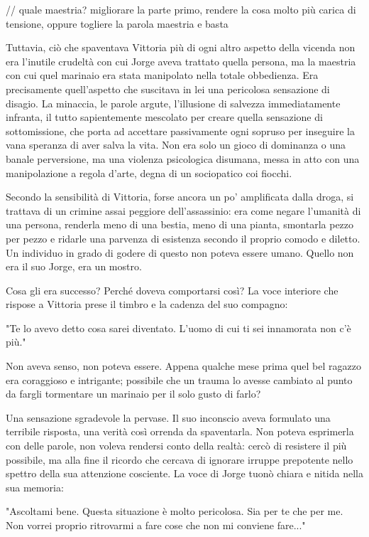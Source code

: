 // quale maestria? migliorare la parte primo, rendere la cosa molto più carica di tensione, oppure togliere la parola maestria e basta

Tuttavia, ciò che spaventava Vittoria più di ogni altro aspetto della vicenda non era l'inutile crudeltà con cui Jorge aveva trattato quella persona, ma la maestria con cui quel marinaio era stata manipolato nella totale obbedienza. Era precisamente quell'aspetto che suscitava in lei una pericolosa sensazione di disagio. La minaccia, le parole argute, l'illusione di salvezza immediatamente infranta, il tutto sapientemente mescolato per creare quella sensazione di sottomissione, che porta ad accettare passivamente ogni sopruso per inseguire la vana speranza di aver salva la vita. Non era solo un gioco di dominanza o una banale perversione, ma una violenza psicologica disumana, messa in atto con una manipolazione a regola d'arte, degna di un sociopatico coi fiocchi.

Secondo la sensibilità di Vittoria, forse ancora un po' amplificata dalla droga, si trattava di un crimine assai peggiore dell'assassinio: era come negare l'umanità di una persona, renderla meno di una bestia, meno di una pianta, smontarla pezzo per pezzo e ridarle una parvenza di esistenza secondo il proprio comodo e diletto. Un individuo in grado di godere di questo non poteva essere umano. Quello non era il suo Jorge, era un mostro.

Cosa gli era successo? Perché doveva comportarsi così? La voce interiore che rispose a Vittoria prese il timbro e la cadenza del suo compagno:

"Te lo avevo detto cosa sarei diventato. L'uomo di cui ti sei innamorata non c'è più."

Non aveva senso, non poteva essere. Appena qualche mese prima quel bel ragazzo era coraggioso e intrigante; possibile che un trauma lo avesse cambiato al punto da fargli tormentare un marinaio per il solo gusto di farlo?

Una sensazione sgradevole la pervase. Il suo inconscio aveva formulato una terribile risposta, una verità così orrenda da spaventarla. Non poteva esprimerla con delle parole, non voleva rendersi conto della realtà: cercò di resistere il più possibile, ma alla fine il ricordo che cercava di ignorare irruppe prepotente nello spettro della sua attenzione cosciente. La voce di Jorge tuonò chiara e nitida nella sua memoria:

"Ascoltami bene. Questa situazione è molto pericolosa. Sia per te che per me. Non vorrei proprio ritrovarmi a fare cose che non mi conviene fare..."

